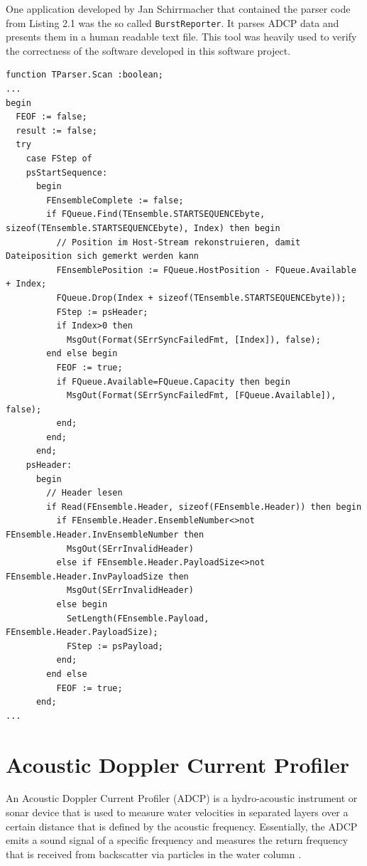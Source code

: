 One application developed by Jan Schirrmacher that contained the parser code from Listing 2.1 was the so called \texttt{BurstReporter}. It parses ADCP data and presents them in a human readable text file. This tool was heavily used to verify the correctness of the software developed in this software project.
\vspace{5em}
\begin{lstlisting}[language=Delphi, caption=Exemplary ADCP parser code from Jan Schirrmacher]
function TParser.Scan :boolean;
...
begin
  FEOF := false;
  result := false;
  try
    case FStep of
    psStartSequence:
      begin
        FEnsembleComplete := false;
        if FQueue.Find(TEnsemble.STARTSEQUENCEbyte, sizeof(TEnsemble.STARTSEQUENCEbyte), Index) then begin
          // Position im Host-Stream rekonstruieren, damit Dateiposition sich gemerkt werden kann
          FEnsemblePosition := FQueue.HostPosition - FQueue.Available + Index;
          FQueue.Drop(Index + sizeof(TEnsemble.STARTSEQUENCEbyte));
          FStep := psHeader;
          if Index>0 then
            MsgOut(Format(SErrSyncFailedFmt, [Index]), false);
        end else begin
          FEOF := true;
          if FQueue.Available=FQueue.Capacity then begin
            MsgOut(Format(SErrSyncFailedFmt, [FQueue.Available]), false);
          end;
        end;
      end;
    psHeader:
      begin
        // Header lesen
        if Read(FEnsemble.Header, sizeof(FEnsemble.Header)) then begin
          if FEnsemble.Header.EnsembleNumber<>not FEnsemble.Header.InvEnsembleNumber then
            MsgOut(SErrInvalidHeader)
          else if FEnsemble.Header.PayloadSize<>not FEnsemble.Header.InvPayloadSize then
            MsgOut(SErrInvalidHeader)
          else begin
            SetLength(FEnsemble.Payload, FEnsemble.Header.PayloadSize);
            FStep := psPayload;
          end;
        end else
          FEOF := true;
      end;
...
\end{lstlisting}
\vspace{4em}
\section{Acoustic Doppler Current Profiler}
An Acoustic Doppler Current Profiler (ADCP) is a hydro-acoustic instrument or sonar device that is used to measure water velocities in separated layers over a certain distance that is defined by the acoustic frequency. Essentially, the ADCP emits a sound signal of a specific frequency and measures the return frequency that is received from backscatter via particles in the water column \cite{adcp_def}.

